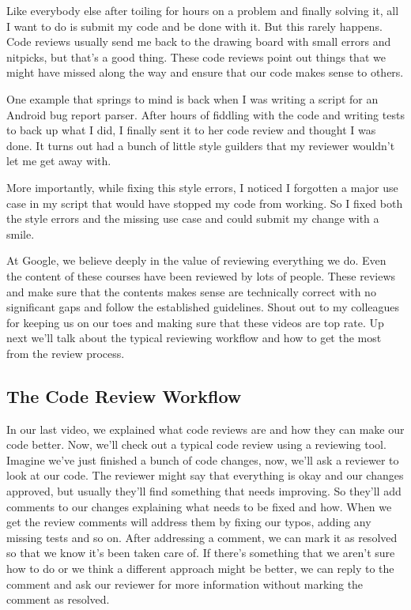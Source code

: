 	Like everybody else after toiling for hours on a problem and finally solving it, all I want to do is submit my code and be done with it. But this rarely happens. Code reviews usually send me back to the drawing board with small errors and nitpicks, but that's a good thing. These code reviews point out things that we might have missed along the way and ensure that our code makes sense to others. 
	
	One example that springs to mind is back when I was writing a script for an Android bug report parser. After hours of fiddling with the code and writing tests to back up what I did, I finally sent it to her code review and thought I was done. It turns out had a bunch of little style guilders that my reviewer wouldn't let me get away with.
	
	More importantly, while fixing this style errors, I noticed I forgotten a major use case in my script that would have stopped my code from working. So I fixed both the style errors and the missing use case and could submit my change with a smile. 
	
	At Google, we believe deeply in the value of reviewing everything we do. Even the content of these courses have been reviewed by lots of people. These reviews and make sure that the contents makes sense are technically correct with no significant gaps and follow the established guidelines. Shout out to my colleagues for keeping us on our toes and making sure that these videos are top rate. Up next we'll talk about the typical reviewing workflow and how to get the most from the review process.
	
	\subsection{The Code Review Workflow}
	
	In our last video, we explained what code reviews are and how they can make our code better. Now, we'll check out a typical code review using a reviewing tool.
	Imagine we've just finished a bunch of code changes, now, we'll ask a reviewer to look at our code. 
	The reviewer might say that everything is okay and our changes approved, but usually they'll find something that needs improving. 
	So they'll add comments to our changes explaining what needs to be fixed and how. 
	When we get the review comments will address them by fixing our typos, adding any missing tests and so on. 
	After addressing a comment, we can mark it as resolved so that we know it's been taken care of.
	If there's something that we aren't sure how to do or we think a different approach might be better, we can reply to the comment and ask our reviewer for more information without marking the comment as resolved. 
	
